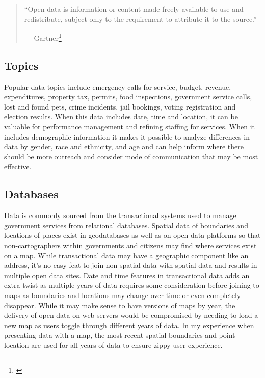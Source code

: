 \documentclass[
  openany]{book}
\begin{document}
\begin{quote}
``Open data is information or content made freely available to use and redistribute, subject only to the requirement to attribute it to the source.''

--- Gartner\footnote{\citet{gartner_opendata_def}}
\end{quote}

\hypertarget{topics}{%
\subsection{Topics}\label{topics}}

Popular data topics include emergency calls for service, budget, revenue, expenditures, property tax, permits, food inspections, government service calls, lost and found pets, crime incidents, jail bookings, voting registration and election results. When this data includes date, time and location, it can be valuable for performance management and refining staffing for services. When it includes demographic information it makes it possible to analyze differences in data by gender, race and ethnicity, and age and can help inform where there should be more outreach and consider mode of communication that may be most effective.

\hypertarget{databases}{%
\subsection{Databases}\label{databases}}

Data is commonly sourced from the transactional systems used to manage government services from relational databases.
Spatial data of boundaries and locations of places exist in geodatabases as well as on open data platforms so that non-cartographers within governments and citizens may find where services exist on a map. While transactional data may have a geographic component like an address, it's no easy feat to join non-spatial data with spatial data and results in multiple open data sites. Date and time features in transactional data adds an extra twist as multiple years of data requires some consideration before joining to maps as boundaries and locations may change over time or even completely disappear. While it may make sense to have versions of maps by year, the delivery of open data on web servers would be compromised by needing to load a new map as users toggle through different years of data. In my experience when presenting data with a map, the most recent spatial boundaries and point location are used for all years of data to ensure zippy user experience.
\end{document}

